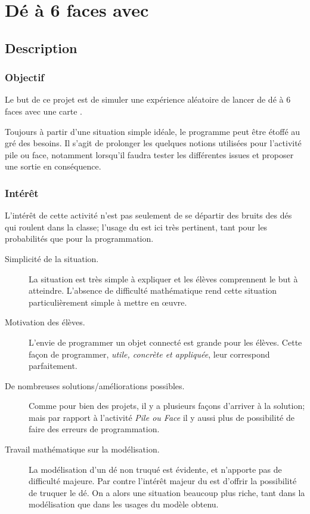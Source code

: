


\section{Dé à 6 faces avec \mb}

\subsection{Description}

\subsubsection{Objectif}

\begin{formule}
Le but de ce projet est de simuler une expérience aléatoire de lancer de dé à 6 faces avec une carte \mb.

Toujours à partir d’une situation simple idéale, le programme peut être étoffé au gré des besoins. Il s'agit de prolonger les quelques notions utilisées pour l'activité pile ou face, notamment lorsqu'il faudra tester les différentes issues et proposer une sortie en conséquence.
\end{formule}

\subsubsection{Intérêt}
L'intérêt de cette activité n'est pas seulement de se départir des bruits des dés qui roulent dans la classe; l'usage du \mb est ici très pertinent, tant pour les probabilités que pour la programmation.
\begin{description}
    \item [Simplicité de la situation.] La situation est très simple à expliquer et les élèves comprennent le but à atteindre. L'absence de difficulté mathématique rend cette situation particulièrement simple à mettre en œuvre.
    \item [Motivation des élèves.] L'envie de programmer un objet connecté est grande pour les élèves. Cette façon de programmer, \emph{utile, concrète et appliquée}, leur correspond parfaitement.
    \item [De nombreuses solutions/améliorations possibles.] Comme pour bien des projets, il y a plusieurs façons d'arriver à la solution; mais par rapport à l'activité \emph{Pile ou Face} il y aussi plus de possibilité de faire des erreurs de programmation.
    \item [Travail mathématique sur la modélisation.] La modélisation d'un dé non truqué est évidente, et n'apporte pas de difficulté majeure. Par contre l'intérêt majeur du \mb est d'offrir la possibilité de truquer le dé. On a alors une situation beaucoup plus riche, tant dans la modélisation que dans les usages du modèle obtenu.
\end{description}



